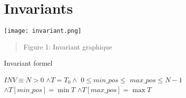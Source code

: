 \section{Invariants}\label{invariants}

\centering
\texttt{[image: invariant.png]}
\setlength{\marginparwidth}{10pt}
\begin{quote}
    \centering
    Figure 1: Invariant graphique
\end{quote}
\vspace{1.2cm}

Invariant formel
\par
\vspace{0.3cm}

$INV \overset{}{\equiv} N>0$
$\land T=T_0 \land$
$0 \leq min\_pos \leq$
$max\_pos \leq N-1$
$\land T[min\_pos]=\min T$
$\land T[max\_pos]=\max T$

\vspace{1.2cm}
